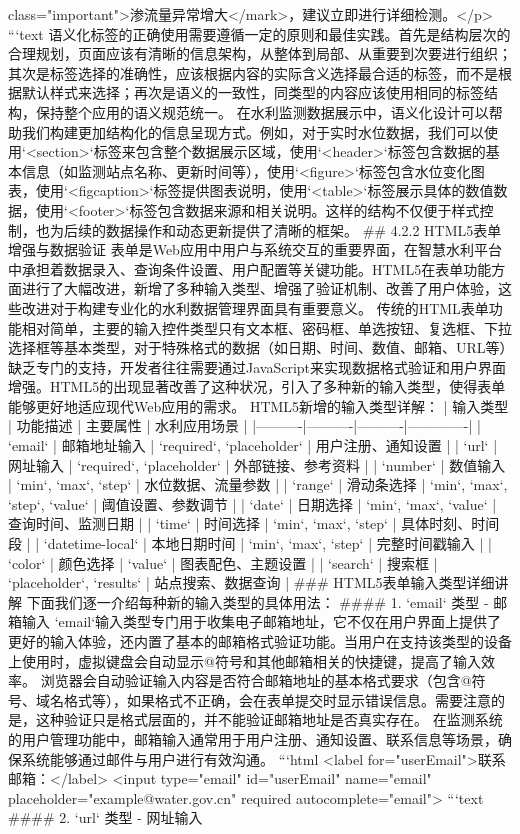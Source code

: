 class="important">渗流量异常增大</mark>，建议立即进行详细检测。</p> ```text 语义化标签的正确使用需要遵循一定的原则和最佳实践。首先是结构层次的合理规划，页面应该有清晰的信息架构，从整体到局部、从重要到次要进行组织；其次是标签选择的准确性，应该根据内容的实际含义选择最合适的标签，而不是根据默认样式来选择；再次是语义的一致性，同类型的内容应该使用相同的标签结构，保持整个应用的语义规范统一。 在水利监测数据展示中，语义化设计可以帮助我们构建更加结构化的信息呈现方式。例如，对于实时水位数据，我们可以使用`<section>`标签来包含整个数据展示区域，使用`<header>`标签包含数据的基本信息（如监测站点名称、更新时间等），使用`<figure>`标签包含水位变化图表，使用`<figcaption>`标签提供图表说明，使用`<table>`标签展示具体的数值数据，使用`<footer>`标签包含数据来源和相关说明。这样的结构不仅便于样式控制，也为后续的数据操作和动态更新提供了清晰的框架。 ## 4.2.2 HTML5表单增强与数据验证 表单是Web应用中用户与系统交互的重要界面，在智慧水利平台中承担着数据录入、查询条件设置、用户配置等关键功能。HTML5在表单功能方面进行了大幅改进，新增了多种输入类型、增强了验证机制、改善了用户体验，这些改进对于构建专业化的水利数据管理界面具有重要意义。 传统的HTML表单功能相对简单，主要的输入控件类型只有文本框、密码框、单选按钮、复选框、下拉选择框等基本类型，对于特殊格式的数据（如日期、时间、数值、邮箱、URL等）缺乏专门的支持，开发者往往需要通过JavaScript来实现数据格式验证和用户界面增强。HTML5的出现显著改善了这种状况，引入了多种新的输入类型，使得表单能够更好地适应现代Web应用的需求。 HTML5新增的输入类型详解： | 输入类型 | 功能描述 | 主要属性 | 水利应用场景 | |----------|----------|----------|-------------| | `email` | 邮箱地址输入 | `required`, `placeholder` | 用户注册、通知设置 | | `url` | 网址输入 | `required`, `placeholder` | 外部链接、参考资料 | | `number` | 数值输入 | `min`, `max`, `step` | 水位数据、流量参数 | | `range` | 滑动条选择 | `min`, `max`, `step`, `value` | 阈值设置、参数调节 | | `date` | 日期选择 | `min`, `max`, `value` | 查询时间、监测日期 | | `time` | 时间选择 | `min`, `max`, `step` | 具体时刻、时间段 | | `datetime-local` | 本地日期时间 | `min`, `max`, `step` | 完整时间戳输入 | | `color` | 颜色选择 | `value` | 图表配色、主题设置 | | `search` | 搜索框 | `placeholder`, `results` | 站点搜索、数据查询 | ### HTML5表单输入类型详细讲解 下面我们逐一介绍每种新的输入类型的具体用法： #### 1. `email` 类型 - 邮箱输入 `email`输入类型专门用于收集电子邮箱地址，它不仅在用户界面上提供了更好的输入体验，还内置了基本的邮箱格式验证功能。当用户在支持该类型的设备上使用时，虚拟键盘会自动显示@符号和其他邮箱相关的快捷键，提高了输入效率。 浏览器会自动验证输入内容是否符合邮箱地址的基本格式要求（包含@符号、域名格式等），如果格式不正确，会在表单提交时显示错误信息。需要注意的是，这种验证只是格式层面的，并不能验证邮箱地址是否真实存在。 在监测系统的用户管理功能中，邮箱输入通常用于用户注册、通知设置、联系信息等场景，确保系统能够通过邮件与用户进行有效沟通。 ```html <label for="userEmail">联系邮箱：</label> <input type="email" id="userEmail" name="email" placeholder="example@water.gov.cn" required autocomplete="email"> ```text #### 2. `url` 类型 - 网址输入 